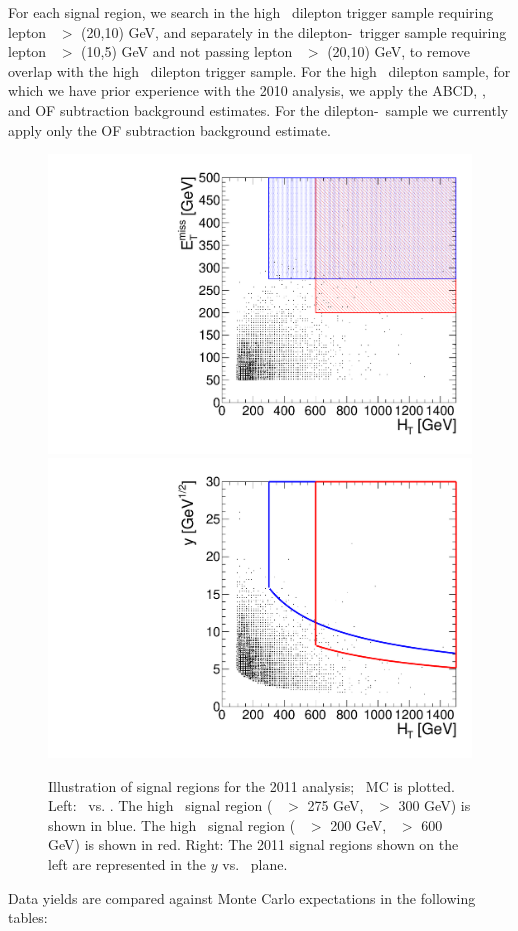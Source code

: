 For each signal region, we search in the high \pt\ dilepton trigger sample
requiring lepton \pt\ $>$ (20,10) GeV, and separately in the dilepton-\Ht\ trigger
sample requiring lepton \pt\ $>$ (10,5) GeV and not passing lepton \pt\ $>$ (20,10) GeV,
to remove overlap with the high \pt\ dilepton trigger sample. For the high \pt\ dilepton
sample, for which we have prior experience with the 2010 analysis, we apply the 
ABCD, \ptll, and OF subtraction background estimates. For the dilepton-\Ht\ sample
we currently apply only the OF subtraction background estimate.

\clearpage

\begin{figure}[h!]
\begin{center}
\includegraphics[width=0.45\linewidth]{plots/sigregions_met_ht_tt.pdf}
\includegraphics[width=0.45\linewidth]{plots/sigregions_y_ht_tt.pdf}
\caption{\label{fig:sigRegion}\protect
Illustration of signal regions for the 2011 analysis; \ttbar \, MC is plotted.
Left: \met\ vs. \Ht. The high \met\ signal region ( \met\ $>$ 275 GeV, \Ht\ $>$ 300 GeV)
is shown in blue. The high \Ht\ signal region ( \met\ $>$ 200 GeV, \Ht\ $>$ 600 GeV) is
shown in red. Right: The 2011 signal regions shown on the left are represented in
the $y$ vs. \Ht\ plane.
}
\end{center}
\end{figure}


Data yields are compared against Monte Carlo expectations in the following tables:


